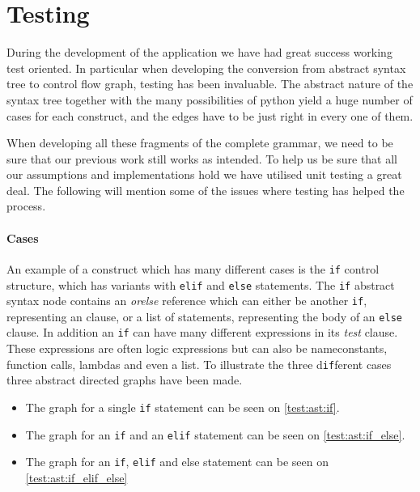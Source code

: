 \section{Testing}
During the development of the application we have had great success working test oriented.
In particular when developing the conversion from abstract syntax tree to control flow graph, testing has been invaluable.
The abstract nature of the syntax tree together with the many possibilities of python yield a huge number of cases for each construct, and the edges have to be just right in every one of them.

When developing all these fragments of the complete grammar, we need to be sure that our previous work still works as intended.
To help us be sure that all our assumptions and implementations hold we have utilised unit testing a great deal.
The following will mention some of the issues where testing has helped the process.

\paragraph{Cases}
An example of a construct which has many different cases is the \texttt{if} control structure, which has variants with \texttt{elif} and \texttt{else} statements.
The \texttt{if} abstract syntax node contains an \emph{orelse} reference which can either be another \texttt{if}, representing an  clause, or a list of statements, representing the body of an \texttt{else} clause.
In addition an \texttt{if} can have many different expressions in its \emph{test} clause.
These expressions are often logic expressions but can also be nameconstants, function calls, lambdas and even a list.
To illustrate the three d\texttt{if}ferent cases three abstract directed graphs have been made.
\begin{itemize}
\item The graph for a single \texttt{if} statement can be seen on \cref{test:ast:if}.
\item The graph for an \texttt{if} and an \texttt{elif} statement can be seen on \cref{test:ast:if_else}.
\item The graph for an \texttt{if}, \texttt{elif} and else statement can be seen on \cref{test:ast:if_elif_else}
\end{itemize}

